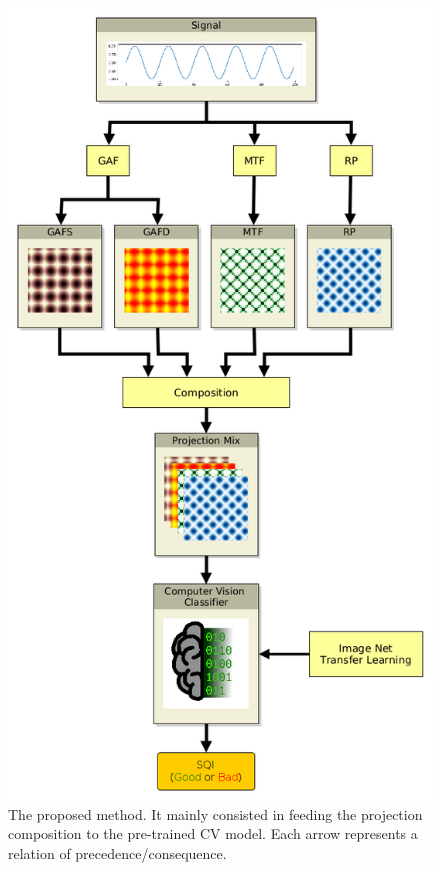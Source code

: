 \begin{figure}[t]
	\centering
	\includegraphics[height=0.8\textheight]{img/method.png}
	\caption{The proposed method. It mainly consisted in feeding the projection composition to the pre-trained \gls{CV} model. Each arrow represents a relation of precedence/consequence.}
	\label{fig:method}
\end{figure}
